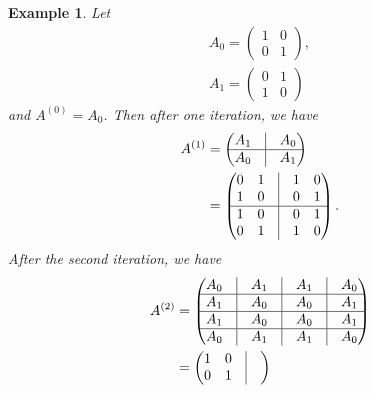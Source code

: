 \documentclass[a4paper,11pt]{article}
\theoremstyle{mystyle}
\newtheorem{exmp}{Example}
\begin{document}
\begin{exmp}\label{ex1}
Let
\begin{align*}
A_0 = \begin{pmatrix}
1 & 0\\
0 & 1
\end{pmatrix},\\
A_1 = \begin{pmatrix}
0 & 1\\
1 & 0
\end{pmatrix}
\end{align*}
and $A^{(0)} = A_0$. Then after one iteration, we have
\begin{align*}
A^{(1)} & = \begin{pmatrix}
A_1 & \vline & A_0\\ \hline
A_0 & \vline & A_1
\end{pmatrix}\\
& = \begin{pmatrix}
\begin{matrix}
0 & 1\\
1 & 0
\end{matrix} & \vline &
\begin{matrix}
1 & 0 \\
0 & 1
\end{matrix} \\ \hline
\begin{matrix}
1 & 0\\
0 & 1
\end{matrix} & \vline &
\begin{matrix}
0 & 1 \\
1 & 0
\end{matrix}
\end{pmatrix}.
\end{align*}
After the second iteration, we have
\begin{align*}
A^{(2)} & = \begin{pmatrix}
A_0 & \vline & A_1 & \vline & A_1 & \vline & A_0 \\ \hline
A_1 & \vline & A_0 & \vline & A_0 & \vline & A_1 \\ \hline
A_1 & \vline & A_0 & \vline & A_0 & \vline & A_1 \\ \hline
A_0 & \vline & A_1 & \vline & A_1 & \vline & A_0
\end{pmatrix} \\
& = \begin{pmatrix}
\begin{matrix}
1 & 0\\
0 & 1
\end{matrix} & \vline &

\end{pmatrix}
\end{align*}
\end{exmp}
\end{document}

